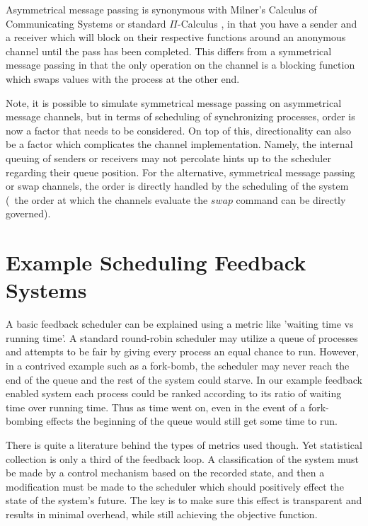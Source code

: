 Asymmetrical message passing is synonymous with Milner's Calculus of Communicating Systems \cite{milner1982calculus} 
or standard $\Pi$-Calculus \cite{palamidessi1997comparing}, in that you have a sender and a receiver which will 
block on their respective functions around an anonymous channel until the pass has been completed. This differs from a 
symmetrical message passing in that the only operation on the channel is a blocking function which swaps values 
with the process at the other end.

Note, it is possible to simulate symmetrical message passing on asymmetrical message channels, but in terms of scheduling of
synchronizing processes, order is now a factor that needs to be considered. On top of this, directionality can also be a factor
which complicates the channel implementation. Namely, the internal queuing of senders or receivers may not percolate hints up to
the scheduler regarding their queue position. For the alternative, symmetrical message passing or swap channels, the order is
directly handled by the scheduling of the system (\ie~the order at which the channels evaluate the $swap$ command can be 
directly governed).

\section{Example Scheduling Feedback Systems}

A basic feedback scheduler can be explained using a metric like 'waiting time vs running time'. A standard round-robin
scheduler may utilize a queue of processes and attempts to be fair by giving every process an equal chance to run.
However, in a contrived example such as a fork-bomb, the scheduler may never reach the end of the queue and the rest of 
the system could starve. In our example feedback enabled system each process could be ranked according to its ratio of 
waiting time over running time. Thus as time went on, even in the event of a fork-bombing effects the beginning of the
queue would still get some time to run.

There is quite a literature behind the types of metrics used though. Yet statistical collection is 
only a third of the feedback loop. A classification of the system must be made by a control mechanism based on the 
recorded state, and then a modification must be made to the scheduler which should positively 
effect the state of the system's future. The key is to make sure this effect is transparent and results in minimal
overhead, while still achieving the objective function.

